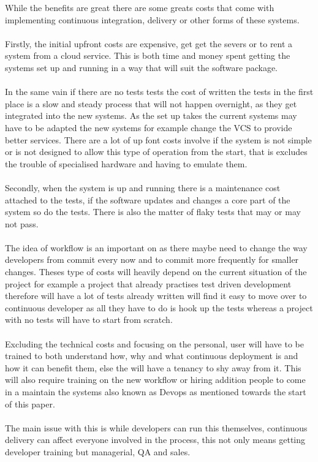 While the benefits are great there are some greats costs that come with implementing continuous integration, delivery or other forms of these systems.
\\\\
Firstly, the initial upfront costs are expensive, get get the severs or to rent a system from a cloud service. This is both time and money spent getting the systems set up and running in a way that will suit the software package. 
\\\\
In the same vain if there are no tests tests the cost of written the tests in the first place is a slow and steady process that will not happen overnight, as they get integrated into the new systems. As the set up takes the current systems may have to be adapted the new systems for example change the VCS to provide better services. There are a lot of up font costs involve if the system is not simple or is not designed to allow this type of operation from the start, that is excludes the trouble of specialised hardware and having to emulate them. 
\\\\
Secondly, when the system is up and running there is a maintenance cost attached to the tests, if the software updates and changes a core part of the system so do the tests. There is also the matter of flaky tests that may or may not pass.
\\\\
The idea of workflow is an important on as there maybe need to change the way developers from commit every now and to commit more frequently for smaller changes. Theses type of costs will heavily depend on the current situation of the project for example a project that already practises test driven development therefore will have a lot of tests already written will find it easy to move over to continuous developer as all they have to do is hook up the tests whereas a project with no tests will have to start from scratch. 
\\\\
Excluding the technical costs and focusing on the personal, user will have to be trained to both understand how, why and what continuous deployment is and how it can benefit them, else the will have a tenancy to shy away from it. This will also require training on the new workflow or hiring addition people to come in a maintain the systems also known as Devops as mentioned towards the start of this paper.
\\\\
The main issue with this is while developers can run this themselves, continuous delivery can affect everyone involved in the process, this not only means getting developer training but managerial, QA and sales. 

